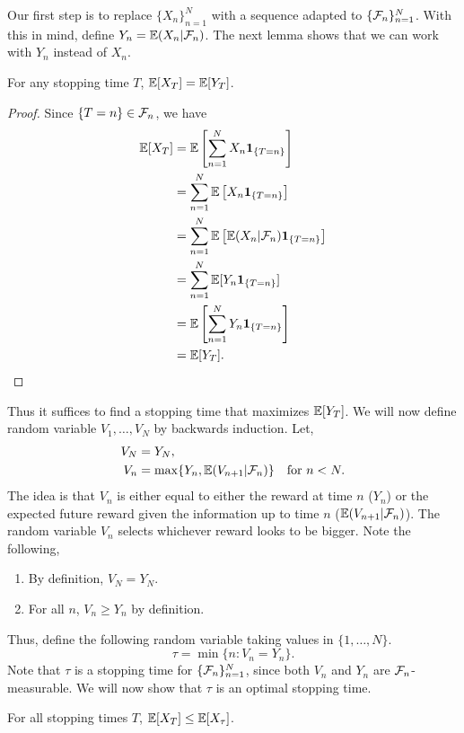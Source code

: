 Our first step is to replace $\{X_n\}_{n=1}^N$ with a sequence adapted to $\{{\mathcal{F}}_n\}_{n=1}^N$. With this in mind, define $Y_n = {\mathbb{E}}(X_n|{\mathcal{F}}_n)$. The next lemma shows that we can work with $Y_n$ instead of $X_n$.
\begin{lemma}\label{Ys}
    For any stopping time $T$, ${\mathbb{E}}[X_T]={\mathbb{E}}[Y_T]$.
\end{lemma}
\begin{proof}
    Since $\{T=n\} \in {\mathcal{F}}_n$, we have
    \begin{align*}
        {\mathbb{E}}[X_T] &={\mathbb{E}}\left[\sum_{n=1}^N X_n {{\bf 1}}_{\{T=n\}}\right] \\
        &=\sum_{n=1}^N {\mathbb{E}}\left[X_n{{\bf 1}}_{\{T=n\}}\right]\\
        &=\sum_{n=1}^N {\mathbb{E}}\left[{\mathbb{E}}(X_n|{\mathcal{F}}_n){{\bf 1}}_{\{T=n\}}\right]\\
        &=\sum_{n=1}^N{\mathbb{E}}[Y_n{{\bf 1}}_{\{T=n\}}]\\
        &={\mathbb{E}}\left[\sum_{n=1}^NY_n{{\bf 1}}_{\{T=n\}}\right]\\
        &={\mathbb{E}}[Y_T].\qedhere 
    \end{align*}
\end{proof}
Thus it suffices to find a stopping time that maximizes ${\mathbb{E}}[Y_T]$. We will now define random variable $V_1,\ldots,V_N$ by backwards induction. Let,
\begin{align*}
    V_N &= Y_N,\\
    V_n &= \max\{Y_n, {\mathbb{E}}(V_{n+1}|{\mathcal{F}}_n)\} ~~~\text{for } n < N.
\end{align*}
The idea is that $V_n$ is either equal to either the reward at time $n$ ($Y_n$) or the expected future reward given the information up to time $n$ (${\mathbb{E}}(V_{n+1}|{\mathcal{F}}_n)$). The random variable $V_n$ selects whichever reward looks to be bigger. Note the following,
\begin{enumerate}
    \item By definition, $V_N = Y_N$.
    \item For all $n$, $V_n \ge Y_n$ by definition.
\end{enumerate}
Thus, define the following random variable taking values in $\{1,\ldots,N\}$.
\[\tau = \min\{n : V_n = Y_n\}.\]
Note that $\tau$ is a stopping time for $\{{\mathcal{F}}_n\}_{n=1}^N$, since both $V_n$ and $Y_n$ are ${\mathcal{F}}_n$-measurable. We will now show that $\tau$ is an optimal stopping time.
\begin{theorem}
    For all stopping times $T$, ${\mathbb{E}}[X_T] \le {\mathbb{E}}[X_\tau]$.
\end{theorem}
